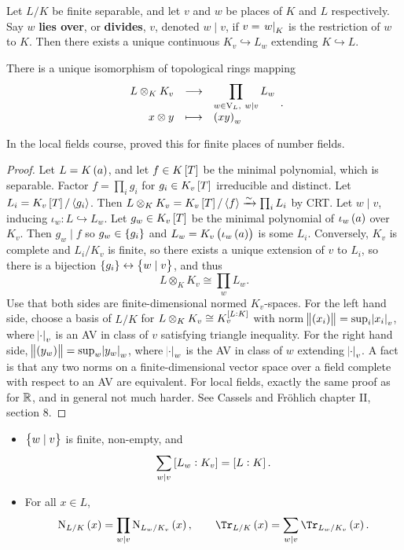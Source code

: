 Let $ L / K $ be finite separable, and let $ v $ and $ w $ be places of $ K $ and $ L $ respectively. Say $ w $ \textbf{lies over}, or \textbf{divides}, $ v $, denoted $ w \mid v $, if $ v = \left. w \right|_K $ is the restriction of $ w $ to $ K $. Then there exists a unique continuous $ K_v \hookrightarrow L_w $ extending $ K \hookrightarrow L $.

\begin{proposition}
There is a unique isomorphism of topological rings mapping
$$ \function{L \otimes_K K_v}{\prod_{w \in \V_L, \ w \mid v} L_w}{x \otimes y}{\br{xy}_w}. $$
\end{proposition}

In the local fields course, proved this for finite places of number fields.

\begin{proof}
Let $ L = K\br{a} $, and let $ f \in K\sbr{T} $ be the minimal polynomial, which is separable. Factor $ f = \prod_i g_i $ for $ g_i \in K_v\sbr{T} $ irreducible and distinct. Let $ L_i = K_v\sbr{T} / \abr{g_i} $. Then $ L \otimes_K K_v = K_v\sbr{T} / \abr{f} \xrightarrow{\sim} \prod_i L_i $ by CRT. Let $ w \mid v $, inducing $ \iota_w : L \hookrightarrow L_w $. Let $ g_w \in K_v\sbr{T} $ be the minimal polynomial of $ \iota_w\br{a} $ over $ K_v $. Then $ g_w \mid f $ so $ g_w \in \cbr{g_i} $ and $ L_w = K_v\br{\iota_w\br{a}} $ is some $ L_i $. Conversely, $ K_v $ is complete and $ L_i / K_v $ is finite, so there exists a unique extension of $ v $ to $ L_i $, so there is a bijection $ \cbr{g_i} \leftrightarrow \cbr{w \mid v} $, and thus
$$ L \otimes_K K_v \cong \prod_w L_w. $$
Use that both sides are finite-dimensional normed $ K_v $-spaces. For the left hand side, choose a basis of $ L / K $ for $ L \otimes_K K_v \cong K_v^{\sbr{L : K}} $ with norm $ \norm{\br{x_i}} = \sup_i \abs{x_i}_v $, where $ \abs{\cdot}_v $ is an AV in class of $ v $ satisfying triangle inequality. For the right hand side, $ \norm{\br{y_w}} = \sup_w \abs{y_w}_w $, where $ \abs{\cdot}_w $ is the AV in class of $ w $ extending $ \abs{\cdot}_v $. A fact is that any two norms on a finite-dimensional vector space over a field complete with respect to an AV are equivalent. For local fields, exactly the same proof as for $ \mathbb{R} $, and in general not much harder. See Cassels and Fr\"ohlich chapter II, section $ 8 $.
\end{proof}

\begin{corollary}
\label{cor:1.6}
\hfill
\begin{itemize}
\item $ \cbr{w \mid v} $ is finite, non-empty, and
$$ \sum_{w \mid v} \sbr{L_w : K_v} = \sbr{L : K}. $$
\item For all $ x \in L $,
$$ \N_{L / K}\br{x} = \prod_{w \mid v} \N_{L_w / K_v}\br{x}, \qquad \Tr_{L / K}\br{x} = \sum_{w \mid v} \Tr_{L_w / K_v}\br{x}. $$
\end{itemize}
\end{corollary}

